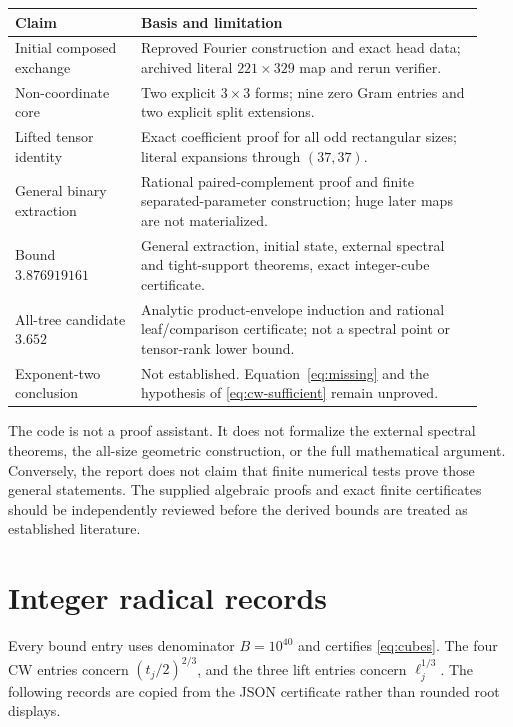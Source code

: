 \documentclass[11pt]{article}
\theoremstyle{definition}\newtheorem{definition}[theorem]{Definition}
\theoremstyle{remark}\newtheorem{remark}[theorem]{Remark}
\begin{document}
\begin{center}\small
\begin{tabular}{p{0.25\linewidth}p{0.68\linewidth}}
\toprule
Claim & Basis and limitation\\\midrule
Initial composed exchange & Reproved Fourier construction and exact head data; archived literal $221\times329$ map and rerun verifier.\\[3pt]
Non-coordinate core & Two explicit $3\times3$ forms; nine zero Gram entries and two explicit split extensions.\\[3pt]
Lifted tensor identity & Exact coefficient proof for all odd rectangular sizes; literal expansions through $(37,37)$.\\[3pt]
General binary extraction & Rational paired-complement proof and finite separated-parameter construction; huge later maps are not materialized.\\[3pt]
Bound $3.876919161$ & General extraction, initial state, external spectral and tight-support theorems, exact integer-cube certificate.\\[3pt]
All-tree candidate $3.652$ & Analytic product-envelope induction and rational leaf/comparison certificate; not a spectral point or tensor-rank lower bound.\\[3pt]
Exponent-two conclusion & Not established. Equation~\eqref{eq:missing} and the hypothesis of \eqref{eq:cw-sufficient} remain unproved.\\\bottomrule
\end{tabular}
\end{center}

The code is not a proof assistant. It does not formalize the external spectral theorems, the all-size geometric construction, or the full mathematical argument. Conversely, the report does not claim that finite numerical tests prove those general statements. The supplied algebraic proofs and exact finite certificates should be independently reviewed before the derived bounds are treated as established literature.

\appendix
\section{Integer radical records}\label{app:radicals}

Every bound entry uses denominator $B=10^{40}$ and certifies \eqref{eq:cubes}. The four CW entries concern $(t_j/2)^{2/3}$, and the three lift entries concern $\ell_j^{1/3}$. The following records are copied from the JSON certificate rather than rounded root displays.

\end{document}
